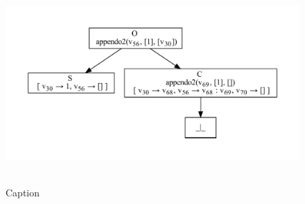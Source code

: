 \begin{figure}[htb]
    \centering
    \includegraphics[height=3in,width=5in]{fig/appendo.pdf}
    \caption{Caption}
    \label{fig:appendo}
\end{figure}